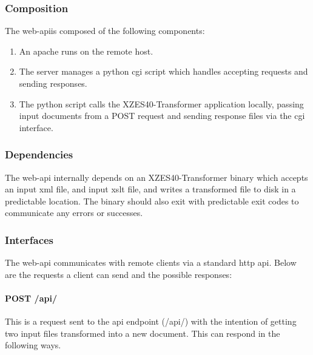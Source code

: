\subsubsection{Composition}

The \gls{web-api}is composed of the following components:

\begin{enumerate}
  \item  An \gls{apache} runs on the remote host.\cite{apache-server}
  \item The server manages a \gls{python} \gls{cgi} script which handles accepting requests and sending responses.
  \item The \gls{python} script calls the XZES40-Transformer application locally, passing input documents from a POST request and sending response files via the \gls{cgi} interface.
\end{enumerate}

\subsubsection{Dependencies}

The \gls{web-api} internally depends on an XZES40-Transformer binary which accepts an input \gls{xml} file, and input \gls{xslt} file, and writes a transformed file to disk in a predictable location.
The binary should also exit with predictable exit codes to communicate any errors or successes.

\subsubsection{Interfaces}

The \gls{web-api} communicates with remote clients via a standard \gls{http} \gls{api}.
Below are the requests a client can send and the possible responses:

\paragraph{POST /api/}

This is a request sent to the \gls{api} endpoint (/api/) with the intention of getting two input files transformed into a new document.
This can respond in the following ways.

